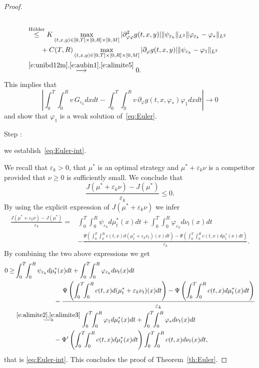 \documentclass[11pt,leqno]{amsart}
\newcounter{stepnb}
\numberwithin{equation}{section}
\begin{document}
\begin{proof}
\begin{equation}
\begin{split}
    \\
    & \stackrel{\text{H\"older}}{\leq} K \max_{(t, x, y) \in [0, T]
      \times [0, R] \times [0, M]} |\partial^2_{{\varphi} {\varphi}} g (t, x,
    y)| \| \psi_{{\varepsilon}_k} \|_{L^2} \| {\varphi}_{{\varepsilon}_k} -
    {\varphi}_\ast \|_{L^2}   
    \\
    & \qquad + C(T,R) \max_{(t, x, y) \in [0, T] \times [0, R] \times
      [0, M]} |\partial_{\varphi}
    g (t, x, y)| \| \psi_{{\varepsilon}_k} - {\varphi}_1\|_{L^2}
    \\
    & \stackrel{\eqref{e:unibd12m},\eqref{e:aubin1},\eqref{e:alimite5}}
    {\longrightarrow}
    0.
  \end{split}
\end{equation}
This implies that 
$$
    \left|
    \int_0^T \! \! \int_0^R v \, G_{{\varepsilon}_k}  dx dt  -
    \int_0^T \! \! \int_0^R v \, \partial_{\varphi} g (t, x, {\varphi}_\ast) 
    {\varphi}_1 dx dt 
    \right| \longrightarrow 0
$$
and show that ${\varphi}_1$ is a weak solution of~\eqref{eq:Euler}. \\
{{{\sc \addtocounter{stepnb}{1}\noindent  Step :} {we establish~\eqref{eq:Euler-int}}.}} We recall that ${\varepsilon}_k >0$,
that $\mu^\ast$ is an optimal strategy and $\mu^\ast + {\varepsilon}_k \nu$
is a competitor provided that  $\nu\ge0$ is sufficiently small.
We conclude that 
\begin{equation*}
\frac{J(\mu^\ast+{\varepsilon}_k \nu)-J(\mu^\ast)}{{\varepsilon}_k}\le 0.
\end{equation*}
By using the explicit expression of $J(\mu^\ast+{\varepsilon}_k \nu)$ we 
 infer 
\begin{align*}
\frac{J(\mu^\ast+{\varepsilon}_k \nu)-J(\mu^\ast)}{{\varepsilon}_k}=&\int_0^T\int_0^R \psi_{{\varepsilon}_k} d\mu_t^*(x)dt+\int_0^T\int_0^R {\varphi}_{{\varepsilon}_k} d\nu_t(x)dt\\
&-\frac{\Psi\left(\displaystyle{
\int_0^T\int_0^R c(t,x)d(\mu_t^*+{\varepsilon}_k \nu_t)(x)dt} \right)-\Psi\left(
\displaystyle{
\int_0^T\int_0^R c(t,x)d\mu_t^*(x)dt} \right)}{{\varepsilon}_k}.
\end{align*}
By combining the two above expressions we get 
\begin{align*}
0\ge &\int_0^T\! \! \int_0^R \psi_{{\varepsilon}_k} d\mu_t^*(x)dt+\int_0^T\! \! \int_0^R {\varphi}_{{\varepsilon}_k} d\nu_t(x)dt\\
&\qquad \qquad\qquad -\frac{\Psi\left(\displaystyle{
\int_0^T\! \! \int_0^R c(t,x)d(\mu_t^*+{\varepsilon}_k \nu_t)(x)dt} \right)-\Psi\left(
\displaystyle{
\int_0^T\! \! \int_0^R c(t,x)d\mu_t^*(x)dt} \right)}{{\varepsilon}_k} \\
& \stackrel{\eqref{e:alimite2},\eqref{e:alimite3}}{\longrightarrow}
\int_0^T\! \! \int_0^R {\varphi}_1 d\mu_t^\ast (x)dt+\int_0^T\! \!
\int_0^R {\varphi}_\ast d\nu_t(x)dt \\
& \qquad \qquad\qquad
- \Psi' \left(\int_0^T\! \! \int_0^R c(t,x)d\mu_t^\ast(x)dt\right)\int_0^T\! \! \int_0^R c(t,x)d\nu_t(x)dt,
\end{align*}
that is \eqref{eq:Euler-int}. This concludes the proof of Theorem~\ref{th:Euler}. 
\end{proof}
\end{document}
